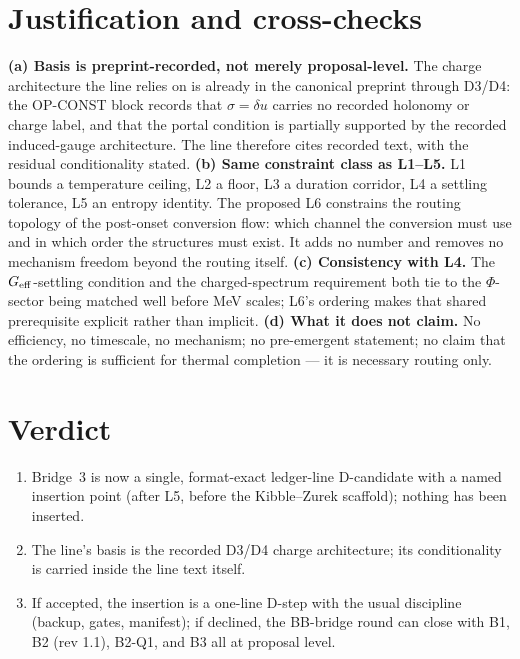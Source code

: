 \documentclass[11pt,a4paper]{article}
\begin{document}
\section{Justification and cross-checks}
\textbf{(a) Basis is preprint-recorded, not merely proposal-level.} The
charge architecture the line relies on is already in the canonical preprint
through D3/D4: the OP-CONST block records that $\sigma=\delta u$ carries no
recorded holonomy or charge label, and that the portal condition is
partially supported by the recorded induced-gauge architecture. The line
therefore cites recorded text, with the residual conditionality stated.
\textbf{(b) Same constraint class as L1--L5.} L1 bounds a temperature
ceiling, L2 a floor, L3 a duration corridor, L4 a settling tolerance, L5 an
entropy identity. The proposed L6 constrains the routing topology of the
post-onset conversion flow: which channel the conversion must use and in
which order the
structures must exist. It adds no number and removes no mechanism freedom
beyond the routing itself.
\textbf{(c) Consistency with L4.} The $G_{\rm eff}$-settling condition and
the charged-spectrum requirement both tie to the $\Phi$-sector being
matched well before MeV scales; L6's ordering makes that shared
prerequisite explicit rather than implicit.
\textbf{(d) What it does not claim.} No efficiency, no timescale, no
mechanism; no pre-emergent statement; no claim that the ordering is
sufficient for thermal completion --- it is necessary routing only.

\section{Verdict}
\begin{enumerate}[leftmargin=1.9em,itemsep=2pt,label=\textbf{V\arabic*.}]
\item Bridge~3 is now a single, format-exact ledger-line D-candidate with a
named insertion point (after L5, before the Kibble--Zurek scaffold);
nothing has been inserted.
\item The line's basis is the recorded D3/D4 charge architecture; its
conditionality is carried inside the line text itself.
\item If accepted, the insertion is a one-line D-step with the usual
discipline (backup, gates, manifest); if declined, the BB-bridge round can
close with B1, B2 (rev 1.1), B2-Q1, and B3 all at proposal level.
\end{enumerate}
\end{document}
